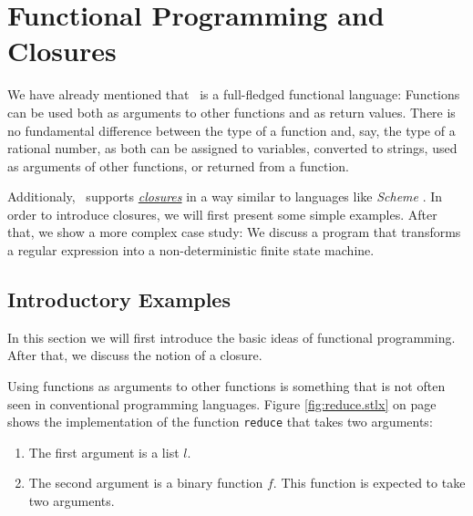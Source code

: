 \chapter{Functional Programming and Closures \label{chapter:closures}}
We have already mentioned that \setlx\ is a full-fledged functional language:
Functions can be used both as arguments to other functions and as return values.  There is
no fundamental difference between the type of a function and, say, the type of a rational
number, as both can be assigned to variables, converted to strings, used as arguments of other
functions, or returned from a function.  

Additionaly, \setlx\ supports
\href{http://en.wikipedia.org/wiki/Closure_(computer_science)}{\emph{closures}}
in a way similar to languages like \textsl{Scheme} \cite{sussman:75}. 
In order to introduce closures, we will first present some simple examples.  After that, we show
a more complex case study: We discuss a program that transforms a regular expression into a
non-deterministic finite state machine.

\section{Introductory Examples}
In this section we will first introduce the basic ideas of functional programming.
After that, we discuss the notion of a closure.

Using functions as arguments to other functions is something that is not often seen in
conventional programming languages.  Figure \ref{fig:reduce.stlx} on page \pageref{fig:reduce.stlx}
shows the implementation of the function \texttt{reduce} that takes two arguments:
\begin{enumerate}
\item The first argument is a list $l$.
\item The second argument is a binary function $f$.  This function is expected to take two
      arguments.
\end{enumerate}


